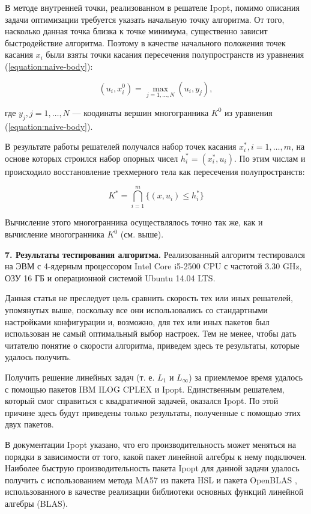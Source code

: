 \documentclass[a4paper, 10pt]{article}
\theoremstyle{definition}
\theoremstyle{plain}
\theoremstyle{plain}
\begin{document}
В методе внутренней точки, реализованном в решателе Ipopt, помимо описания
задачи оптимизации требуется указать начальную точку алгоритма. От того,
насколько данная точка близка к точке минимума, существенно зависит
быстродействие алгоритма. Поэтому в качестве начального положения точек касания
$x_{i}$ были взяты точки касания пересечения полупространств из уравнения
(\ref{equation:naive-body}):

\begin{equation}
 (u_{i}, x^{0}_{i}) = \max \limits_{j = 1, \ldots, N} (u_{i}, y_{j}),
\end{equation}

где $y_{j}, j = 1, \ldots, N$ --- коодинаты вершин многогранника $K^{0}$ из
уравнения (\ref{equation:naive-body}).

В результате работы решателей получался набор точек касания
$x^{*}_{i}, i = 1, \ldots, m$, на основе которых строился набор опорных чисел
$h^{*}_{i} = (x^{*}_{i}, u_{i})$. По этим числам и происходило восстановление
трехмерного тела как пересечения полупространств:

\begin{equation}
 K^{*} = \bigcap \limits_{i = 1}^{m} \{(x, u_{i}) \leq h^{*}_{i}\}
\end{equation}

Вычисление этого многогранника осуществлялось точно так же, как и вычисление
многогранника $K^{0}$ (см. выше).

\textbf{7. Результаты тестирования алгоритма.}
Реализованный алгоритм тестировался на ЭВМ с 4-ядерным процессором
Intel Core i5-2500 CPU с частотой 3.30 GHz, ОЗУ 16 ГБ и операционной
системой Ubuntu 14.04 LTS.

Данная статья не преследует цель сравнить скорость тех или иных решателей,
упомянутых выше, поскольку все они использовались со стандартными настройками
конфигурации и, возможно, для тех или иных пакетов был использован не самый
оптимальный выбор настроек. Тем не менее, чтобы дать читателю понятие о
скорости алгоритма, приведем здесь те результаты, которые удалось получить.

Получить решение линейных задач (т. е. $L_{1}$ и $L_{\infty}$) за приемлемое
время удалось с помощью пакетов IBM ILOG CPLEX и Ipopt. Единственным решателем,
который смог справиться с квадратичной задачей, оказался Ipopt. По этой причине
здесь будут приведены только результаты, полученные с помощью этих двух пакетов.

В документации Ipopt указано, что его производительность может меняться на
порядки в зависимости от того, какой пакет линейной алгебры к нему подключен.
Наиболее быструю производительность пакета Ipopt для данной задачи удалось
получить с использованием метода MA57 из пакета HSL \cite{hsl} и пакета
OpenBLAS \cite{xianyi2013openblas}, использованного в качестве реализации
библиотеки основных функций линейной алгебры (BLAS).
\end{document}
